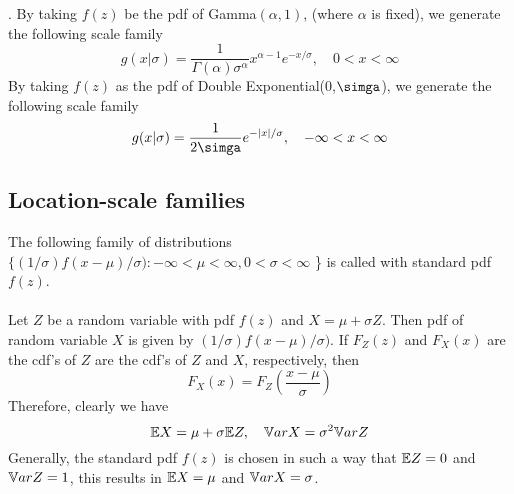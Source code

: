 \begin{note}
    . By taking $f(z)$ be the pdf of Gamma$(\alpha,1)$, (where $\alpha$ is fixed), we generate the following scale family
    $$
    g(x|\sigma) = \frac{1}{\Gamma(\alpha)\sigma^{\alpha}}x^{\alpha-1}e^{-x/\sigma}, \quad 0 < x < \infty
    $$
     By taking $f(z)$ as the pdf of Double Exponential(0,$\simga$), we generate the following scale family
    $$
    g(x|\sigma) = \frac{1}{2\simga}e^{-\abs{x}/\sigma}, \quad -\infty < x < \infty
    $$
\end{note}

\subsection{Location-scale families}
The following family of distributions 
$\{ (1/ \sigma)f(x-\mu)/ \sigma): -\infty < \mu < \infty, 0 < \sigma < \infty$ \}
is called  with standard pdf $f(z)$.
\\ \\
Let $Z$ be a random variable with pdf $f(z)$ and $X = \mu + \sigma Z$. 
Then pdf of random variable $X$ is given by $(1/\sigma)f(x-\mu)/\sigma)$. If $F_Z(z)$ and $F_X(x)$ are the cdf's of $Z$ are the cdf's of $Z$ and $X$, respectively, then
$$
F_X(x) = F_Z \left(\frac{x-\mu}{\sigma} \right)
$$
Therefore, clearly we have
$$
\mathbb E X = \mu + \sigma \mathbb E Z, \quad \mathbb V ar X = \sigma^2 \mathbb V ar Z
$$
Generally, the standard pdf $f(z)$ is chosen in such a way that $\mathbb E Z = 0$ and $\mathbb V ar Z = 1$, this results in $\mathbb E X = \mu$ and $\mathbb V ar X = \sigma$. 